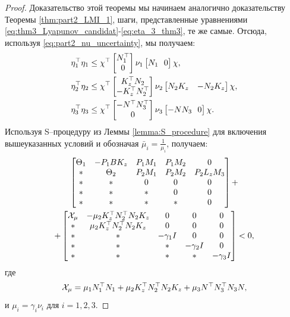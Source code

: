 \begin{proof}
	Доказательство этой теоремы мы начинаем аналогично доказательству Теоремы \ref{thm:part2_LMI_1}, шаги, представленные уравнениями \eqref{eq:thm3_Lyapunov_candidat}-\eqref{eq:eta_3_thm3}, те же самые. Отсюда, используя \eqref{eq:part2_nu_uncertainty}, мы получаем:
	\begin{align}
		\label{eq:eta1_bound}
		\eta_1^\top\eta_1 &\leq \chi^\top \begin{bmatrix}
			{N}_1^\top \\ 0  
		\end{bmatrix}\nu_1\begin{bmatrix}
			{N}_1 \ \ 0  
		\end{bmatrix} \chi,
		\\
		\eta_2^\top\eta_2 &\leq \chi^\top \begin{bmatrix}
			{K}_z^\top{N}_2 \\ -{K}_z^\top{N}_2^\top  
		\end{bmatrix}\nu_2\begin{bmatrix}
			{N}_2{K}_z & -{N}_2{K}_z
		\end{bmatrix} \chi,
		\\
		\eta_3^\top\eta_3 &\leq \chi^\top \begin{bmatrix}
			-{N}^\top{N}_3^\top \\ 0  
		\end{bmatrix}\nu_3\begin{bmatrix}
			-{N}{N}_3 \ \ 0  
		\end{bmatrix} \chi.
	\end{align}
	Используя S--процедуру из Леммы \ref{lemma:S_procedure} для включения вышеуказанных условий и обозначая $\bar{\mu}_i=\frac{1}{\mu_i}$, получаем:
	\begin{multline}
		\begin{bmatrix}
			{\Theta}_1 & -{P}_1{B}{K}_z & {P}_1{M}_1 & {P}_1{M}_2 &0 \\
			* &    {\Theta}_2 & {P}_2{M}_1 & {P}_2{M}_2 & {P}_2{L}_z{M}_3\\
			* & * & 0 & 0&0\\
			* & * & * & 0&0 \\
			* & * & * & *&0
		\end{bmatrix} + \\
		+ \begin{bmatrix}
			\mathcal{X}_{\mu}& -\mu_2{K}_z^\top{N}_2^\top{N}_2{K}_z &0 &0 & 0\\
			*&\mu_2{K}_z^\top{N}_2^\top{N}_2{K}_z&0&0&0\\
			*&*&-\gamma_1{I}&0&0\\
			*&*&*&-\gamma_2{I}&0\\
			*&*&*&*&-\gamma_3{I}\\
		\end{bmatrix} 
		<0,
	\end{multline}
	где
	\begin{equation}
		\mathcal{X}_{\mu}=\mu_1{N}_1^\top{N}_1 +\mu_2{K}_z^\top{N}_2^\top{N}_2{K}_z+\mu_3{N}^\top{N}_3^\top{N}_3{N},
	\end{equation}
	и $\mu_i=\gamma_i\nu_i$ для $i=1,2,3$.
	

\end{proof}
